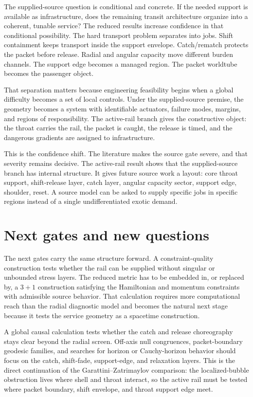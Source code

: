 \documentclass[11pt]{article}
\begin{document}
The supplied-source question is conditional and concrete. If the needed support is available as infrastructure, does the remaining transit architecture organize into a coherent, tunable service? The reduced results increase confidence in that conditional possibility. The hard transport problem separates into jobs. Shift containment keeps transport inside the support envelope. Catch/rematch protects the packet before release. Radial and angular capacity move different burden channels. The support edge becomes a managed region. The packet worldtube becomes the passenger object.

That separation matters because engineering feasibility begins when a global difficulty becomes a set of local controls. Under the supplied-source premise, the geometry becomes a system with identifiable actuators, failure modes, margins, and regions of responsibility. The active-rail branch gives the constructive object: the throat carries the rail, the packet is caught, the release is timed, and the dangerous gradients are assigned to infrastructure.

This is the confidence shift. The literature makes the source gate severe, and that severity remains decisive. The active-rail result shows that the supplied-source branch has internal structure. It gives future source work a layout: core throat support, shift-release layer, catch layer, angular capacity sector, support edge, shoulder, reset. A source model can be asked to supply specific jobs in specific regions instead of a single undifferentiated exotic demand.

\section{Next gates and new questions}

The next gates carry the same structure forward. A constraint-quality construction tests whether the rail can be supplied without singular or unbounded stress layers. The reduced metric has to be embedded in, or replaced by, a $3+1$ construction satisfying the Hamiltonian and momentum constraints with admissible source behavior. That calculation requires more computational reach than the radial diagnostic model and becomes the natural next stage because it tests the service geometry as a spacetime construction.

A global causal calculation tests whether the catch and release choreography stays clear beyond the radial screen. Off-axis null congruences, packet-boundary geodesic families, and searches for horizon or Cauchy-horizon behavior should focus on the catch, shift-fade, support-edge, and relaxation layers. This is the direct continuation of the Garattini--Zatrimaylov comparison: the localized-bubble obstruction lives where shell and throat interact, so the active rail must be tested where packet boundary, shift envelope, and throat support edge meet.
\end{document}
